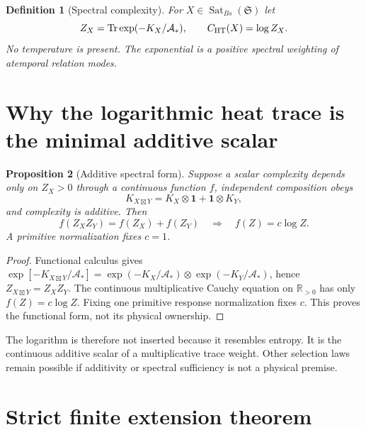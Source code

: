 \documentclass[11pt,a4paper]{article}
\newtheorem{definition}{Definition}[section]
\newtheorem{proposition}[definition]{Proposition}
\theoremstyle{remark}
\newcommand{\Sat}{\operatorname{Sat}_{Bs}}
\newcommand{\Tr}{\operatorname{Tr}}
\newcommand{\id}{\mathbf 1}
\begin{document}
\begin{definition}[Spectral complexity]
For $X\in\Sat(\mathfrak S)$ let
\begin{equation}
 Z_X=\Tr\exp(-K_X/\mathcal A_*),
 \qquad C_{\rm HT}(X)=\log Z_X.
 \label{eq:heatcomplexity}
\end{equation}
No temperature is present.  The exponential is a positive spectral weighting
of atemporal relation modes.
\end{definition}

\section{Why the logarithmic heat trace is the minimal additive scalar}

\begin{proposition}[Additive spectral form]
Suppose a scalar complexity depends only on $Z_X>0$ through a continuous
function $f$, independent composition obeys
\begin{equation}
 K_{X\boxtimes Y}=K_X\otimes\id+\id\otimes K_Y,
 \label{eq:tensork}
\end{equation}
and complexity is additive.  Then
\begin{equation}
 f(Z_XZ_Y)=f(Z_X)+f(Z_Y)
 \quad\Longrightarrow\quad f(Z)=c\log Z.
 \label{eq:cauchy}
\end{equation}
A primitive normalization fixes $c=1$.
\end{proposition}

\begin{proof}
Functional calculus gives
$\exp[-K_{X\boxtimes Y}/\mathcal A_*]
=\exp(-K_X/\mathcal A_*)\otimes\exp(-K_Y/\mathcal A_*)$, hence
$Z_{X\boxtimes Y}=Z_XZ_Y$.  The continuous multiplicative Cauchy equation on
$\mathbb R_{>0}$ has only $f(Z)=c\log Z$.  Fixing one primitive response
normalization fixes $c$.  This proves the functional form, not its physical
ownership.
\end{proof}

The logarithm is therefore not inserted because it resembles entropy.  It is
the continuous additive scalar of a multiplicative trace weight.  Other
selection laws remain possible if additivity or spectral sufficiency is not a
physical premise.

\section{Strict finite extension theorem}
\end{document}
